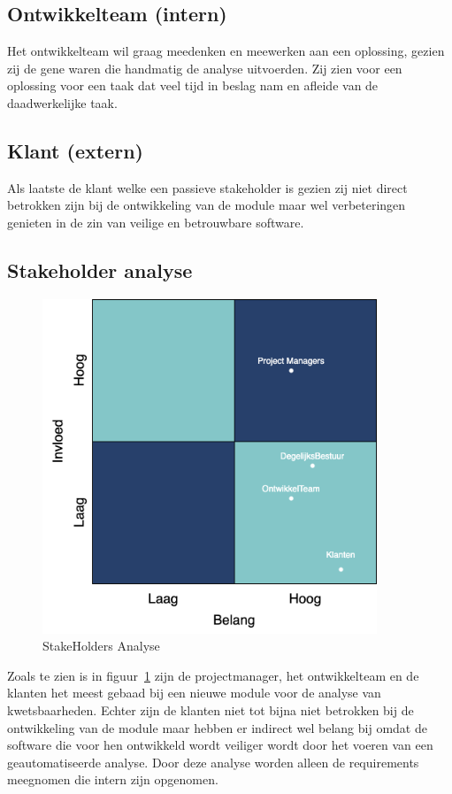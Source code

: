 \subsection{Ontwikkelteam (intern)}\label{subsec:ontwikkelteam-(intern)}
Het ontwikkelteam wil graag meedenken en meewerken aan een oplossing, gezien zij de gene waren die handmatig de analyse uitvoerden.
Zij zien voor een oplossing voor een taak dat veel tijd in beslag nam en afleide van de daadwerkelijke taak.
\subsection{Klant (extern)}\label{subsec:klant-(extern)}
Als laatste de klant welke een passieve stakeholder is gezien zij niet direct betrokken zijn bij de ontwikkeling van de module maar wel verbeteringen genieten in de zin van veilige en betrouwbare software.

\subsection{Stakeholder analyse}\label{subsec:stakeholder-analyse}
\begin{figure}[H]
\myfloatalign
\includegraphics[width=10cm]{gfx/stakeholderanalyse}
\caption{StakeHolders Analyse}
\label{fig:StakeholderAnalyse}
\end{figure}
Zoals te zien is in figuur~\ref{fig:StakeholderAnalyse} zijn de projectmanager, het ontwikkelteam en de klanten het meest gebaad bij een nieuwe module voor de analyse van kwetsbaarheden.
Echter zijn de klanten niet tot bijna niet betrokken bij de ontwikkeling van de module maar hebben er indirect wel belang bij omdat de software die voor hen ontwikkeld wordt veiliger wordt door het voeren van een geautomatiseerde analyse.
Door deze analyse worden alleen de requirements meegnomen die intern zijn opgenomen.
